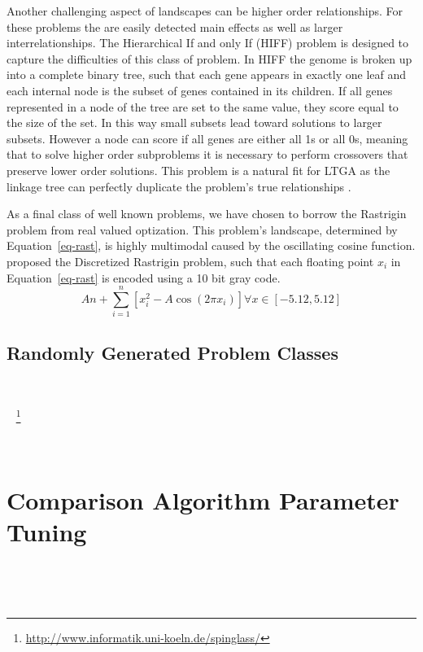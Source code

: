 \documentclass[twoside]{article}
\begin{document}
Another challenging aspect of landscapes can be higher order relationships. For these problems
the are easily detected main effects as well as larger interrelationships. The Hierarchical If
and only If (HIFF) problem is designed to capture the difficulties of this class of problem.
In HIFF the genome is broken up into a complete binary tree, such that each gene appears in exactly one
leaf and each internal node is the subset of genes contained in its children. If all genes represented
in a node of the tree are set to the same value, they score equal to the size of the set. In this way
small subsets lead toward solutions to larger subsets. However a node can score if all genes are either
all 1s or all 0s, meaning that to solve higher order subproblems it is necessary to perform crossovers
that preserve lower order solutions. This problem is a natural fit for LTGA as the linkage tree can
perfectly duplicate the problem's true relationships \citep{thierens:2013:ltgahiff}.

As a final class of well known problems, we have chosen to borrow the Rastrigin problem from real valued
optization. This problem's landscape, determined by Equation~\ref{eq-rast}, is highly multimodal caused by
the oscillating cosine function. \cite{goldman:2014:p3} proposed the Discretized Rastrigin problem, such
that each floating point $x_i$ in Equation~\ref{eq-rast} is encoded using a 10 bit gray code.
\begin{equation}
  An + \sum_{i=1}^{n}\left [ x_i^2-A\cos (2\pi x_i) \right ] \forall x\in [-5.12,5.12]
  \label{eq-rast}
\end{equation}


\subsection{Randomly Generated Problem Classes}

~\cite{wright:2000:solvingnk}

~\cite{saul:1994:spinglass}
\footnote{\url{http://www.informatik.uni-koeln.de/spinglass/}}

~\cite{goldman:2014:p3} %

\section{Comparison Algorithm Parameter Tuning}
\label{sec-tuning}

~\cite{goldman:2012:ltga} %

~\cite{goldman:2014:p3}
\end{document}
